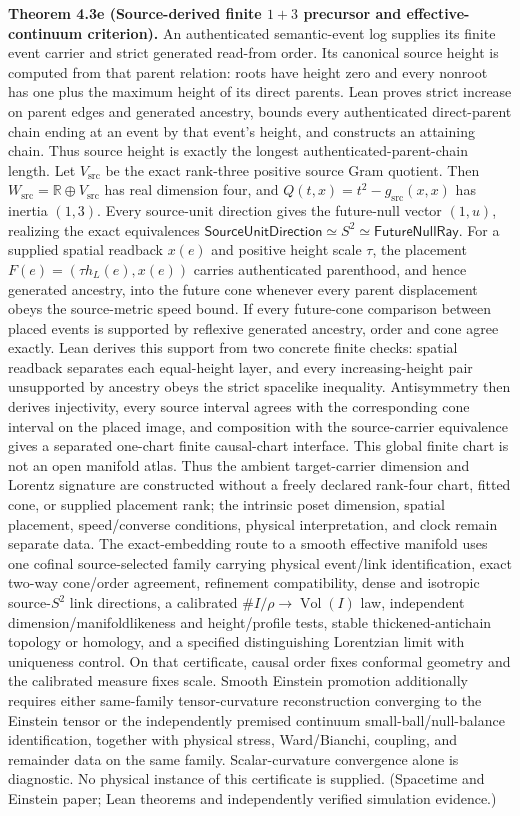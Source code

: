 \textbf{Theorem 4.3e (Source-derived finite \(1+3\) precursor and effective-continuum criterion).} An authenticated semantic-event log supplies its finite event carrier and strict generated read-from order. Its canonical source height is computed from that parent relation: roots have height zero and every nonroot has one plus the maximum height of its direct parents. Lean proves strict increase on parent edges and generated ancestry, bounds every authenticated direct-parent chain ending at an event by that event's height, and constructs an attaining chain. Thus source height is exactly the longest authenticated-parent-chain length. Let \(V_{\mathrm{src}}\) be the exact rank-three positive source Gram quotient. Then \(W_{\mathrm{src}}=\mathbb R\oplus V_{\mathrm{src}}\) has real dimension four, and \(Q(t,x)=t^2-g_{\mathrm{src}}(x,x)\) has inertia \((1,3)\). Every source-unit direction gives the future-null vector \((1,u)\), realizing the exact equivalences \(\mathsf{SourceUnitDirection}\simeq S^2\simeq\mathsf{FutureNullRay}\). For a supplied spatial readback \(x(e)\) and positive height scale \(\tau\), the placement \(F(e)=(\tau h_L(e),x(e))\) carries authenticated parenthood, and hence generated ancestry, into the future cone whenever every parent displacement obeys the source-metric speed bound. If every future-cone comparison between placed events is supported by reflexive generated ancestry, order and cone agree exactly. Lean derives this support from two concrete finite checks: spatial readback separates each equal-height layer, and every increasing-height pair unsupported by ancestry obeys the strict spacelike inequality. Antisymmetry then derives injectivity, every source interval agrees with the corresponding cone interval on the placed image, and composition with the source-carrier equivalence gives a separated one-chart finite causal-chart interface. This global finite chart is not an open manifold atlas. Thus the ambient target-carrier dimension and Lorentz signature are constructed without a freely declared rank-four chart, fitted cone, or supplied placement rank; the intrinsic poset dimension, spatial placement, speed/converse conditions, physical interpretation, and clock remain separate data. The exact-embedding route to a smooth effective manifold uses one cofinal source-selected family carrying physical event/link identification, exact two-way cone/order agreement, refinement compatibility, dense and isotropic source-\(S^2\) link directions, a calibrated \(\#I/\rho\to\operatorname{Vol}(I)\) law, independent dimension/manifoldlikeness and height/profile tests, stable thickened-antichain topology or homology, and a specified distinguishing Lorentzian limit with uniqueness control. On that certificate, causal order fixes conformal geometry and the calibrated measure fixes scale. Smooth Einstein promotion additionally requires either same-family tensor-curvature reconstruction converging to the Einstein tensor or the independently premised continuum small-ball/null-balance identification, together with physical stress, Ward/Bianchi, coupling, and remainder data on the same family. Scalar-curvature convergence alone is diagnostic. No physical instance of this certificate is supplied. (Spacetime and Einstein paper; Lean theorems and independently verified simulation evidence.)

